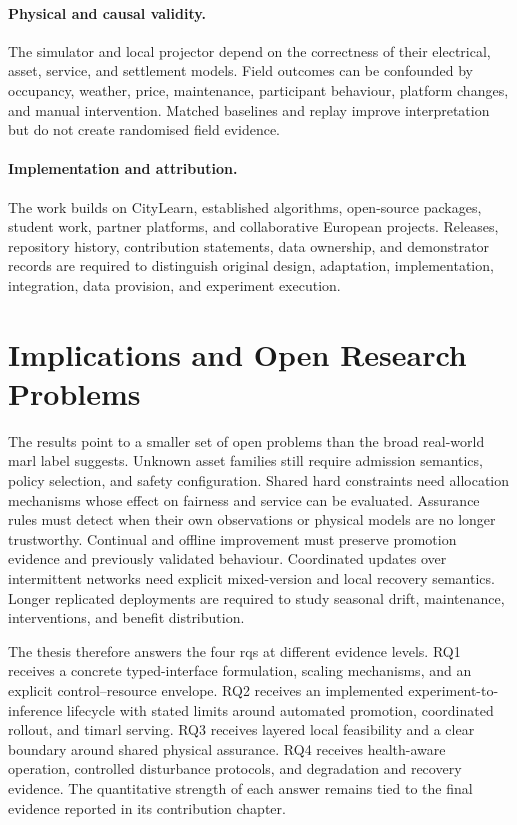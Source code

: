 \paragraph{Physical and causal validity.}
The simulator and local projector depend on the correctness of their electrical, asset, service, and settlement models. Field outcomes can be confounded by occupancy, weather, price, maintenance, participant behaviour, platform changes, and manual intervention. Matched baselines and replay improve interpretation but do not create randomised field evidence.

\paragraph{Implementation and attribution.}
The work builds on CityLearn, established algorithms, open-source packages, student work, partner platforms, and collaborative European projects. Releases, repository history, contribution statements, data ownership, and demonstrator records are required to distinguish original design, adaptation, implementation, integration, data provision, and experiment execution.

\section{Implications and Open Research Problems}
\label{sec:discussion-summary}
\label{sec:discussion-open}

The results point to a smaller set of open problems than the broad real-world \gls{marl} label suggests. Unknown asset families still require admission semantics, policy selection, and safety configuration. Shared hard constraints need allocation mechanisms whose effect on fairness and service can be evaluated. Assurance rules must detect when their own observations or physical models are no longer trustworthy. Continual and offline improvement must preserve promotion evidence and previously validated behaviour. Coordinated updates over intermittent networks need explicit mixed-version and local recovery semantics. Longer replicated deployments are required to study seasonal drift, maintenance, interventions, and benefit distribution.

The thesis therefore answers the four \glspl{rq} at different evidence levels. RQ1 receives a concrete typed-interface formulation, scaling mechanisms, and an explicit control--resource envelope. RQ2 receives an implemented experiment-to-inference lifecycle with stated limits around automated promotion, coordinated rollout, and \gls{timarl} serving. RQ3 receives layered local feasibility and a clear boundary around shared physical assurance. RQ4 receives health-aware operation, controlled disturbance protocols, and degradation and recovery evidence. The quantitative strength of each answer remains tied to the final evidence reported in its contribution chapter.

